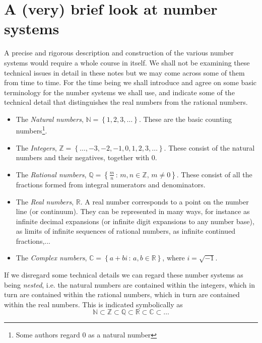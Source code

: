 \documentclass[extrafontsizes, twoside, a4paper]{memoir}
\theoremstyle{plain}%
\theoremstyle{definition}
\theoremstyle{remark}
\begin{document}
\appendix
\appendixpage
%
\chapter{A (very) brief look at number systems}
\label{A:numbers}
A precise and rigorous description and construction of the various number systems would require a whole course in itself. We shall not be examining these technical issues in detail in these notes but we may come across some of them from time to time. For the time being we shall introduce and agree on some basic terminology for the number systems we shall use, and indicate some of the technical detail that distinguishes the real numbers from the rational numbers.

\begin{itemize}
\item
The \emph{Natural numbers}, $\mathbb{N}= \left \{ 1,2,3, \dots \right \}$. These are the basic counting numbers\footnote{Some authors regard $0$ as a natural number}.
\item
The \emph{Integers}, $\mathbb{Z} = \left \{ \dots, -3, -2, -1, 0, 1, 2, 3, \dots \right \}$. These consist of the natural numbers and their negatives, together with $0$.
\item
The \emph{Rational numbers}, $\mathbb{Q} = \left \{ \frac{m}{n} \, : \, m,n \in \mathbb{Z}, \, m \neq 0 \right \}$. These consist of all the fractions formed from integral numerators and denominators.
\item
The \emph{Real numbers}, $\mathbb{R}$. A real number corresponds to a point on the number line (or continuum). They can be represented in many ways, for instance as infinite decimal expansions (or infinite digit expansions to any number base), as limits of infinite sequences of rational numbers, as infinite continued fractions,...
\item
The \emph{Complex numbers}, $\mathbb{C} = \left \{ a+bi \, : \, a,b \in \mathbb{R} \right \}$, where $i=\sqrt{-1}$.
\end{itemize}

If we disregard some technical details we can regard these number systems as being \emph{nested}, i.e. the natural numbers are contained within the integers, which in turn are contained within the rational numbers, which in turn are contained within the real numbers. This is indicated symbolically as
$$ \mathbb{N} \subset \mathbb{Z} \subset \mathbb{Q} \subset \mathbb{R}
\subset \mathbb{C} \subset \dots $$
\end{document}
